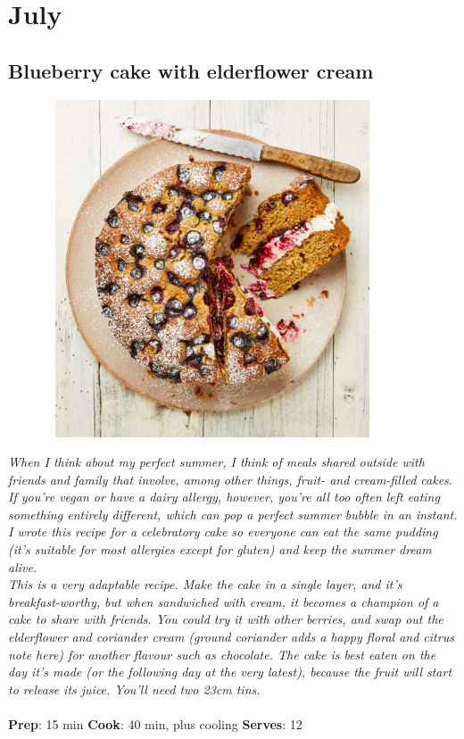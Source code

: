 \documentclass{book}
\begin{document}
\chapter{July}
\section{Blueberry cake with elderflower cream}
\begin{figure}
\centering\includegraphics[width=10cm,height=10cm,keepaspectratio]{Recipe_Pictures/Blueberry_cake_with_elderflower_cream.png}
\end{figure}
\emph{When I think about my perfect summer, I think of meals shared outside with friends and family that involve, among other things, fruit- and cream-filled cakes. If you’re vegan or have a dairy allergy, however, you’re all too often left eating something entirely different, which can pop a perfect summer bubble in an instant. I wrote this recipe for a celebratory cake so everyone can eat the same pudding (it’s suitable for most allergies except for gluten) and keep the summer dream alive.\\ 
This is a very adaptable recipe. Make the cake in a single layer, and it’s breakfast-worthy, but when sandwiched with cream, it becomes a champion of a cake to share with friends. You could try it with other berries, and swap out the elderflower and coriander cream (ground coriander adds a happy floral and citrus note here) for another flavour such as chocolate. The cake is best eaten on the day it’s made (or the following day at the very latest), because the fruit will start to release its juice. You’ll need two 23cm tins.}\\\\ 
\textbf{Prep}: 15 min
\textbf{Cook}: 40 min, plus cooling
\textbf{Serves}: 12
\end{document}
